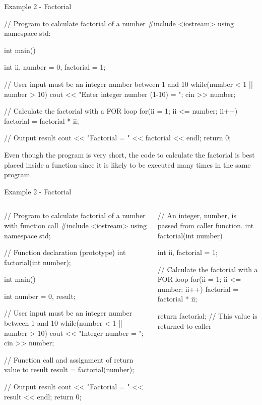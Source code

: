 \documentclass[../lecture4-functions.tex]{subfiles}
\begin{document}

\begin{frame}[fragile]{Example 2 - Factorial}
    \begin{cppcode}[lastline = 25]
// Program to calculate factorial of a number
#include <iostream>
using namespace std;

int main()
{
    int ii, number = 0, factorial = 1;

    // User input must be an integer number between 1 and 10
    while(number < 1 || number > 10)
    {
        cout << "Enter integer number (1-10) = ";
        cin >> number;
    }

    // Calculate the factorial with a FOR loop
    for(ii = 1; ii <= number; ii++)
    {
        factorial = factorial * ii;
    }

    // Output result
    cout << "Factorial = " << factorial << endl;
    return 0;
}
    \end{cppcode}

    Even though the program is very short, the code to calculate the factorial is best placed inside a function since it is likely to be executed many times in the same program.
\end{frame}


\begin{frame}[fragile]{Example 2 - Factorial}
    \begin{columns}[T,onlytextwidth]
            \begin{cppcode}[lastline = 25]
// Program to calculate factorial of a number with function call
#include <iostream>
using namespace std;

// Function declaration (prototype)
int factorial(int number);

int main()
{
    int number = 0, result;

    // User input must be an integer number between 1 and 10
    while(number < 1 || number > 10)
    {
       cout << "Integer number = ";
       cin >> number;
    }

    // Function call and assignment of return value to result
    result = factorial(number);

    // Output result
    cout << "Factorial = " << result << endl;
    return 0;
}
            \end{cppcode}
            \begin{cppcode}[firstnumber = 27, lastline = 39]
// An integer, number, is passed from caller function.
int factorial(int number)
{
    int ii, factorial = 1;

    // Calculate the factorial with a FOR loop
    for(ii = 1; ii <= number; ii++)
    {
        factorial = factorial * ii;
    }

    return factorial; // This value is returned to caller
}
            \end{cppcode}
    \end{columns}
\end{frame}
\end{document}
